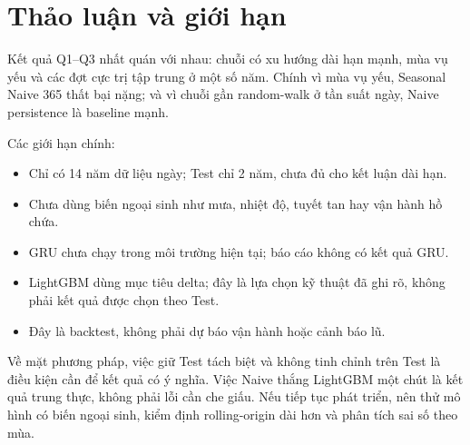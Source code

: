 \section{Thảo luận và giới hạn}

Kết quả Q1--Q3 nhất quán với nhau: chuỗi có xu hướng dài hạn mạnh, mùa vụ yếu và các
đợt cực trị tập trung ở một số năm. Chính vì mùa vụ yếu, Seasonal Naive 365 thất bại
nặng; và vì chuỗi gần random-walk ở tần suất ngày, Naive persistence là baseline mạnh.

Các giới hạn chính:
\begin{itemize}
  \item Chỉ có 14 năm dữ liệu ngày; Test chỉ 2 năm, chưa đủ cho kết luận dài hạn.
  \item Chưa dùng biến ngoại sinh như mưa, nhiệt độ, tuyết tan hay vận hành hồ chứa.
  \item GRU chưa chạy trong môi trường hiện tại; báo cáo không có kết quả GRU.
  \item LightGBM dùng mục tiêu delta; đây là lựa chọn kỹ thuật đã ghi rõ, không phải
        kết quả được chọn theo Test.
  \item Đây là backtest, không phải dự báo vận hành hoặc cảnh báo lũ.
\end{itemize}

Về mặt phương pháp, việc giữ Test tách biệt và không tinh chỉnh trên Test là điều kiện
cần để kết quả có ý nghĩa. Việc Naive thắng LightGBM một chút là kết quả trung thực,
không phải lỗi cần che giấu. Nếu tiếp tục phát triển, nên thử mô hình có biến ngoại
sinh, kiểm định rolling-origin dài hơn và phân tích sai số theo mùa.
